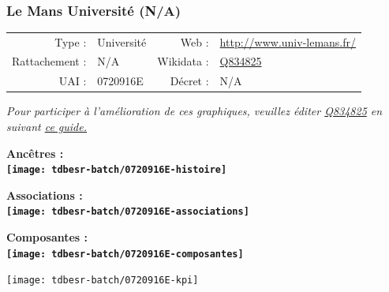 \documentclass[12pt,french,]{article}
\begin{document}
\ifoddpage ~\newpage \fi   

\hypertarget{le-mans-universituxe9-na}{%
\subsubsection{Le Mans Université
(N/A)}\label{le-mans-universituxe9-na}}

\begin{tabular*}{\textwidth}{rp{5cm}rl}  
\hline  
Type : & Université & Web : &\href{http://www.univ-lemans.fr/}{http://www.univ-lemans.fr/} \\  
Rattachement : & N/A & Wikidata : & \href{https://www.wikidata.org/entity/Q834825}{Q834825} \\  
UAI : & 0720916E & Décret : & N/A \\  
\hline  
\end{tabular*}

\textit{\scriptsize Pour participer à l'amélioration de ces graphiques, veuillez éditer  \href{https://www.wikidata.org/entity/Q834825}{Q834825}  en suivant \href{https://github.com/cpesr/wikidataESR/blob/master/Rmd/wikidataESR.md}{ce guide.}}

\vspace{1cm}  
\begin{minipage}[b]{0.50\textwidth}\begin{center} \bf Ancêtres : \\  
\texttt{[image: tdbesr-batch/0720916E-histoire]} \end{center}\end{minipage}\begin{minipage}[b]{0.50\textwidth}\begin{center} \bf Associations : \\  
\texttt{[image: tdbesr-batch/0720916E-associations]} \end{center}\end{minipage}

\hrulefill

\begin{center} \bf Composantes : \\  
\texttt{[image: tdbesr-batch/0720916E-composantes]} \end{center}

\begin{center}\texttt{[image: tdbesr-batch/0720916E-kpi]} \end{center}\checkoddpage

\ifoddpage ~\newpage \fi   
\end{document}
